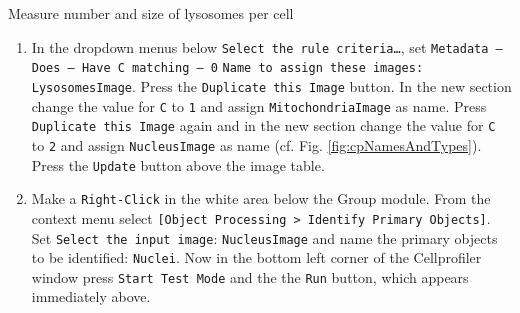 \begin{taskbox}{Measure number and size of lysosomes per cell}
\begin{enumerate}
\item In the dropdown menus below \texttt{Select the rule criteria…}, set \newline 
\texttt{Metadata – Does – Have C matching – 0}\newline
\texttt{Name to assign these images: LysosomesImage}.\newline
Press the \texttt{Duplicate this Image} button. In the new section change the value for \texttt{C} to \texttt{1} and assign
\texttt{MitochondriaImage} as name. Press \texttt{Duplicate this Image} again and in the new section change the value for
\texttt{C} to \texttt{2} and assign \texttt{NucleusImage} as name (cf. Fig. \ref{fig:cpNamesAndTypes}). Press the \texttt{Update} button above the image table.
	\begin{minipage}[t]{\linewidth}
		\begin{center}
		\medskip
		\label{fig:cpNamesAndTypes}
		\end{center}
	\end{minipage}
	
\item Make a \texttt{Right-Click} in the white area below the Group module. From the context menu select \texttt{[Object Processing > Identify Primary Objects]}.
Set \texttt{Select the input image}: \texttt{NucleusImage} and name the primary objects to be identified: \texttt{Nuclei}. Now
in the bottom left corner of the Cellprofiler window press \texttt{Start Test Mode} and the the \texttt{Run} button,
which appears immediately above.


\end{enumerate}
\end{taskbox}
